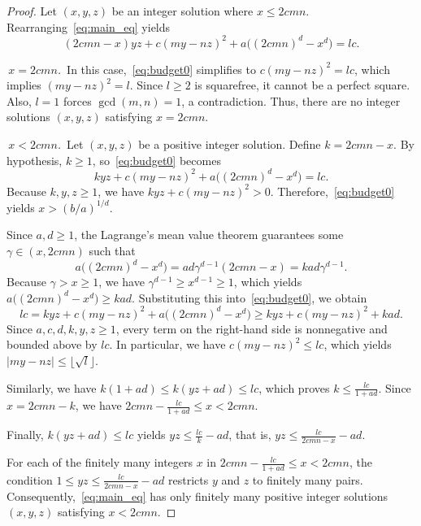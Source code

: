 \documentclass[11pt,a4paper]{amsart}
\theoremstyle{plain}
\theoremstyle{definition}
\begin{document}
\begin{proof}
Let $(x,y,z)$ be an integer solution where $x \le 2cmn$. Rearranging~\eqref{eq:main_eq} yields
\begin{equation}\label{eq:budget0}
(2cmn - x) yz + c(my-nz)^2 + a\bigl((2cmn)^d - x^d\bigr) = l c.
\end{equation}

\smallskip
{} \,\textit{$x = 2cmn$.}\,
In this case,~\eqref{eq:budget0} simplifies to $c(my-nz)^2 = l c $, which implies $(my-nz)^2 = l$. Since $l\ge 2$ is squarefree, it cannot be a perfect square. Also, $l=1$ forces $\gcd(m,n)=1$, a contradiction. Thus, there are no integer solutions $(x,y,z)$ satisfying $x = 2cmn$.

\smallskip
{} \,\textit{$x < 2cmn$.}\,
Let $(x,y,z)$ be a positive integer solution. Define $k = 2cmn - x$. By hypothesis, $k \ge 1$, so~\eqref{eq:budget0} becomes
\[
k yz + c(my-nz)^2 + a\bigl((2cmn)^d - x^d\bigr) = l c.
\]
Because $k ,y,z \ge 1$, we have $k yz + c(my-nz)^2 > 0$. Therefore,~\eqref{eq:budget0} yields $x > (b/a)^{1/d}$.


Since $a,d \ge 1$, the Lagrange's mean value theorem guarantees some $\gamma \in (x, 2cmn)$ such that
\[
a\bigl((2cmn)^d - x^d\bigr) = ad\gamma^{d-1}(2cmn-x) = kad\gamma^{d-1}.
\]
Because $\gamma > x \ge 1$, we have $\gamma^{d-1} \ge x^{d-1} \ge 1$, which yields $a\bigl((2cmn)^d - x^d\bigr) \ge kad$. Substituting this into~\eqref{eq:budget0}, we obtain
\[
l c = k yz + c(my-nz)^2 + a\bigl((2cmn)^d - x^d\bigr) \ge k yz + c(my-nz)^2 + kad.
\]
Since $a,c,d,k,y, z \ge 1$, every term on the right-hand side is nonnegative and bounded above by $l c$. In particular, we have $c(my-nz)^2 \le l c$, which yields $|my-nz| \le \big\lfloor \sqrt{l} \big\rfloor$. 

Similarly, we have $k(1+ad) \le k(yz+ad) \le l c$, which proves
$k \le \frac{l c}{1+ad}$. Since $x = 2cmn - k$, we have $2cmn - \frac{l c}{1+ad} \le x < 2cmn$.

Finally, $k(yz+ad) \le l c$ yields $yz \le \frac{l c}{k} - ad$, that is, $yz \le \frac{l c}{2cmn - x} - ad$.

For each of the finitely many integers $x$ in $2cmn - \frac{l c}{1+ad} \le x < 2cmn$, the condition $1\le yz \le \frac{l c}{2cmn - x} - ad$ restricts $y$ and $z$ to finitely many pairs. Consequently,~\eqref{eq:main_eq} has only finitely many positive integer solutions $(x,y,z)$ satisfying $x < 2cmn$.
\end{proof}
\end{document}
